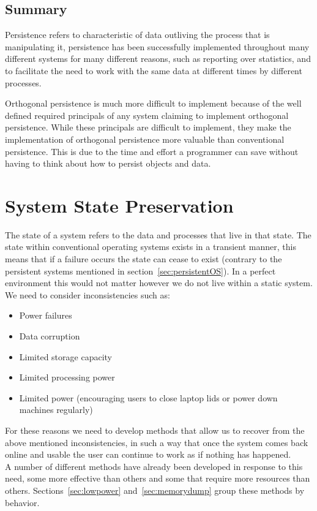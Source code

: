 \documentclass[a4paper,12pt]{article}
\begin{document}
\subsection{Summary}
Persistence refers to characteristic of data outliving the process that is manipulating it, persistence has been successfully implemented throughout many different systems for many different reasons, such as reporting over statistics, and to facilitate the need to work with the same data at different times by different processes. 
\\\par
Orthogonal persistence is much more difficult to implement because of the well defined required principals of any system claiming to implement orthogonal persistence. While these principals are difficult to implement, they make the implementation of orthogonal persistence more valuable than conventional persistence. This is due to the time and effort a programmer can save without having to think about how to persist objects and data. 

\section{System State Preservation}\label{sec:preservation}
The state of a system refers to the data and processes that live in that state. The state within conventional operating systems exists in a transient manner, this means that if a failure occurs the state can cease to exist (contrary to the persistent systems mentioned in section~\ref{sec:persistentOS}). In a perfect environment this would not matter however we do not live within a static system. We need to consider inconsistencies such as:
\begin{itemize}
    \item{Power failures}
    \item{Data corruption}
    \item{Limited storage capacity}
    \item{Limited processing power}
    \item{Limited power (encouraging users to close laptop lids or power down machines regularly)}
\end{itemize}
For these reasons we need to develop methods that allow us to recover from the above mentioned inconsistencies, in such a way that once the system comes back online and usable the user can continue to work as if nothing has happened.
\\A number of different methods have already been developed in response to this need, some more effective than others and some that require more resources than others. Sections~\ref{sec:lowpower} and~\ref{sec:memorydump} group these methods by behavior.
\end{document}
